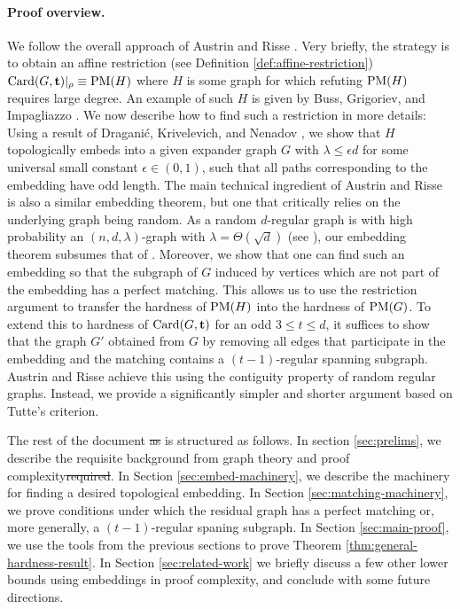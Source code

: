 \documentclass[11pt]{article}
\providecommand{\DIFadd}[1]{\textcolor{shin-ryoku}{#1}}%
\providecommand{\DIFdel}[1]{\textcolor{verylightgray}{\sout{#1}}}                      %
\providecommand{\DIFaddbegin}{} %
\providecommand{\DIFaddend}{} %
\providecommand{\DIFdelbegin}{} %
\providecommand{\DIFdelend}{} %
\begin{document}
\paragraph{Proof overview.}
We follow the overall approach of Austrin and Risse \cite{Austrin_2022}. Very briefly, the strategy is to obtain an affine restriction (see Definition \ref{def:affine-restriction}) $\text{Card}(G, \mathbf{t})|_\rho \equiv \text{PM}(H)$ where $H$ is some graph for which refuting $\text{PM}(H)$ requires large degree.
An example of such $H$ is given by Buss, Grigoriev, and Impagliazzo \cite{buss1999linear}. We now describe how to find such a restriction in more details: Using a result of Dragani\'c, Krivelevich, and Nenadov \cite{draganic22rolling}, we show that $H$ topologically embeds into a given expander graph $G$ with $\lambda \le \epsilon d$ for some universal small constant $\epsilon \in (0,1)$, such that all paths corresponding to the embedding have odd length.
The main technical ingredient of Austrin and Risse is also \DIFaddbegin \DIFadd{a 	}\DIFaddend similar embedding theorem, but one that critically relies on the underlying graph being random.
As a random $d$-regular graph is with high probability an $(n, d, \lambda)$-graph with $\lambda = \Theta(\sqrt{d})$ (see \cite[Theorem A]{tikhomirov2016spectralgapdenserandom}), our embedding theorem subsumes that of \cite{Austrin_2022}.
Moreover, we show that one can find such an embedding so that the subgraph of $G$ induced by vertices which are not part of the embedding has a perfect matching.
This allows us to use the restriction argument to transfer the hardness of $\text{PM}(H)$ into the hardness of $\text{PM}(G)$.
To extend this to hardness of $\text{Card}(G, \mathbf{t})$ for an odd $3 \le t \leq d$, it suffices to show that the graph $G'$ obtained from $G$ by removing all edges that participate in the embedding and the matching contains a $(t-1)$-regular spanning subgraph.
Austrin and Risse achieve this using the contiguity property of random regular graphs. Instead, we provide a significantly simpler and shorter argument based on Tutte's criterion.\par
The rest of the document \DIFdelbegin \DIFdel{as }\DIFdelend is structured as follows. 
In section \ref{sec:prelims}, we describe the requisite background from graph theory and proof complexity\DIFdelbegin \DIFdel{required}\DIFdelend .
In Section \ref{sec:embed-machinery}, we describe the machinery for finding a desired topological embedding.
In Section \ref{sec:matching-machinery}, we prove conditions under which the residual graph has a perfect matching or, more generally, a $(t-1)$-regular spaning subgraph.
In Section \ref{sec:main-proof}, we use the tools from the previous sections to prove Theorem \ref{thm:general-hardness-result}. 
In Section \ref{sec:related-work} we briefly discuss a few other lower bounds using embeddings in proof complexity, and conclude with some future directions.
\end{document}
